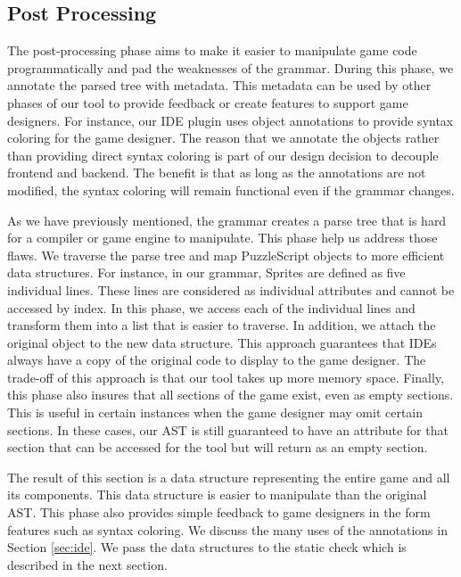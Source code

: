 \subsection{Post Processing}
The post-processing phase aims to make it easier to manipulate game code programmatically and pad the weaknesses of the grammar. During this phase, we annotate the parsed tree with metadata. This metadata can be used by other phases of our tool to provide feedback or create features to support game designers. For instance, our IDE plugin uses object annotations to provide syntax coloring for the game designer. The reason that we annotate the objects rather than providing direct syntax coloring is part of our design decision to decouple frontend and backend. The benefit is that as long as the annotations are not modified, the syntax coloring will remain functional even if the grammar changes.

As we have previously mentioned, the grammar creates a parse tree that is hard for a compiler or game engine to manipulate. This phase help us address those flaws. We traverse the parse tree and map PuzzleScript objects to more efficient data structures. For instance, in our grammar, Sprites are defined as five individual lines. These lines are considered as individual attributes and cannot be accessed by index. In this phase, we access each of the individual lines and transform them into a list that is easier to traverse. In addition, we attach the original object to the new data structure. This approach guarantees that IDEs always have a copy of the original code to display to the game designer. The trade-off of this approach is that our tool takes up more memory space. Finally, this phase also insures that all sections of the game exist, even as empty sections. This is useful in certain instances when the game designer may omit certain sections. In these cases, our AST is still guaranteed to have an attribute for that section that can be accessed for the tool but will return as an empty section.

The result of this section is a data structure representing the entire game and all its components. This data structure is easier to manipulate than the original AST. This phase also provides simple feedback to game designers in the form features such as syntax coloring. We discuss the many uses of the annotations in Section \ref{sec:ide}. We pass the data structures to the static check which is described in the next section.

